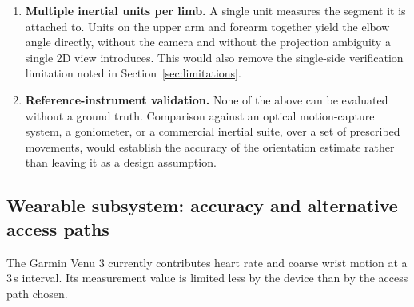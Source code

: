 \documentclass[11pt,a4paper]{article}
\begin{document}
\begin{enumerate}
\item \textbf{Multiple inertial units per limb.} A single unit measures the
segment it is attached to. Units on the upper arm and forearm together yield the
elbow angle directly, without the camera and without the projection ambiguity a
single 2D view introduces. This would also remove the single-side verification
limitation noted in Section~\ref{sec:limitations}.

\item \textbf{Reference-instrument validation.} None of the above can be
evaluated without a ground truth. Comparison against an optical motion-capture
system, a goniometer, or a commercial inertial suite, over a set of prescribed
movements, would establish the accuracy of the orientation estimate rather than
leaving it as a design assumption.
\end{enumerate}

\subsection{Wearable subsystem: accuracy and alternative access paths}

The Garmin Venu 3 currently contributes heart rate and coarse wrist motion at a
3\,s interval. Its measurement value is limited less by the device than by the
access path chosen.
\end{document}
